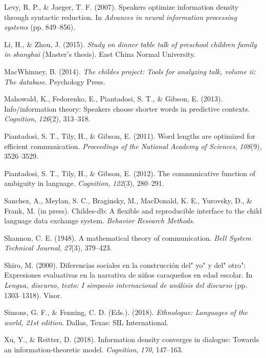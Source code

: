 \documentclass[10pt, letterpaper]{article}
\begin{document}
\leavevmode\hypertarget{ref-levy2007}{}%
Levy, R. P., \& Jaeger, T. F. (2007). Speakers optimize information
density through syntactic reduction. In \emph{Advances in neural
information processing systems} (pp. 849--856).

\leavevmode\hypertarget{ref-li2015}{}%
Li, H., \& Zhou, J. (2015). \emph{Study on dinner table talk of
preschool children family in shanghai} (Master's thesis). East China
Normal University.

\leavevmode\hypertarget{ref-macwhinney2014}{}%
MacWhinney, B. (2014). \emph{The childes project: Tools for analyzing
talk, volume ii: The database}. Psychology Press.

\leavevmode\hypertarget{ref-mahowald2013}{}%
Mahowald, K., Fedorenko, E., Piantadosi, S. T., \& Gibson, E. (2013).
Info/information theory: Speakers choose shorter words in predictive
contexts. \emph{Cognition}, \emph{126}(2), 313--318.

\leavevmode\hypertarget{ref-piantadosi2011}{}%
Piantadosi, S. T., Tily, H., \& Gibson, E. (2011). Word lengths are
optimized for efficient communication. \emph{Proceedings of the National
Academy of Sciences}, \emph{108}(9), 3526--3529.

\leavevmode\hypertarget{ref-piantadosi2012}{}%
Piantadosi, S. T., Tily, H., \& Gibson, E. (2012). The communicative
function of ambiguity in language. \emph{Cognition}, \emph{122}(3),
280--291.

\leavevmode\hypertarget{ref-sanchez2019}{}%
Sanchez, A., Meylan, S. C., Braginsky, M., MacDonald, K. E., Yurovsky,
D., \& Frank, M. (in press). Childes-db: A flexible and reproducible
interface to the child language data exchange system. \emph{Behavior
Research Methods}.

\leavevmode\hypertarget{ref-shannon1948}{}%
Shannon, C. E. (1948). A mathematical theory of communication.
\emph{Bell System Technical Journal}, \emph{27}(3), 379--423.

\leavevmode\hypertarget{ref-shiro2000}{}%
Shiro, M. (2000). Diferencias sociales en la construcción del" yo" y
del" otro": Expresiones evaluativas en la narrativa de niños caraqueños
en edad escolar. In \emph{Lengua, discurso, texto: I simposio
internacional de análisis del discurso} (pp. 1303--1318). Visor.

\leavevmode\hypertarget{ref-simons2018}{}%
Simons, G. F., \& Fenning, C. D. (Eds.). (2018). \emph{Ethnologue:
Languages of the world, 21st edition}. Dallas, Texas: SIL International.

\leavevmode\hypertarget{ref-xu2018}{}%
Xu, Y., \& Reitter, D. (2018). Information density converges in
dialogue: Towards an information-theoretic model. \emph{Cognition},
\emph{170}, 147--163.
\end{document}
